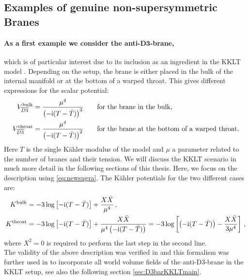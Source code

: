 \documentclass[a4paper,12pt,twoside,openright]{report}
\newcommand{\bea}{\begin{equation}\begin{aligned}}
\newcommand{\eea}{\end{aligned}\end{equation}}
\def\rmi{{\rm i}}
\begin{document}
\subsection{Examples of genuine non-supersymmetric Branes}
\paragraph{As a first example we consider the anti-$\mathbf{D3}$-brane,} which is of particular interest due to its inclusion as an ingredient in the KKLT model \cite{Kachru:2003aw,Kachru:2003sx}. Depending on the setup, the brane is either placed in the bulk of the internal manifold or at the bottom of a warped throat. This gives different expressions for the scalar potential:
\bea 
V^{\text{bulk}}_{\overline{D3}} &= \frac{\mu^4}{\left(-\rmi(T-\bar{T})\right)^3}\qquad \text{for the brane in the bulk,}\\
V^{\text{throat}}_{\overline{D3}} &= \frac{\mu^4}{\left(-\rmi(T-\bar{T})\right)^2}\qquad \text{for the brane at the bottom of a warped throat.}
\eea
Here $T$ is the single Kähler modulus of the model and $\mu$ a parameter related to the number of branes and their tension. We will discuss the KKLT scenario in much more detail in the following sections of this thesis. Here, we focus on the description using \eqref{eq:newsugra}. The Kähler potentials for the two different cases are:
\bea 
K^{\text{bulk}} &= -3 \log \left[ -\rmi(T-\bar{T})\right] + \frac{X \bar{X}}{\mu^4}\,,\\
K^{\text{throat}} &= -3 \log \left[-\rmi (T-\bar{T})\right] + \frac{X\bar{X}}{\mu^4\left(-\rmi (T-\bar{T})\right)} = - 3 \log \left[ \left(-\rmi (T-\bar{T})\right) - \frac{X\bar{X}}{3\mu^4} \right]\,,
\eea
where $X^2=0$ is required to perform the last step in the second line.\\
The validity of the above description was verified in \cite{Kallosh:2014wsa,Bergshoeff:2015jxa} and this formalism was further used in \cite{GarciadelMoral:2017vnz,Cribiori:2019hod} to incorporate all world volume fields of the anti-D3-brane in the KKLT setup, see also the following section \ref{sec:D3barKKLTmain}.
\end{document}

